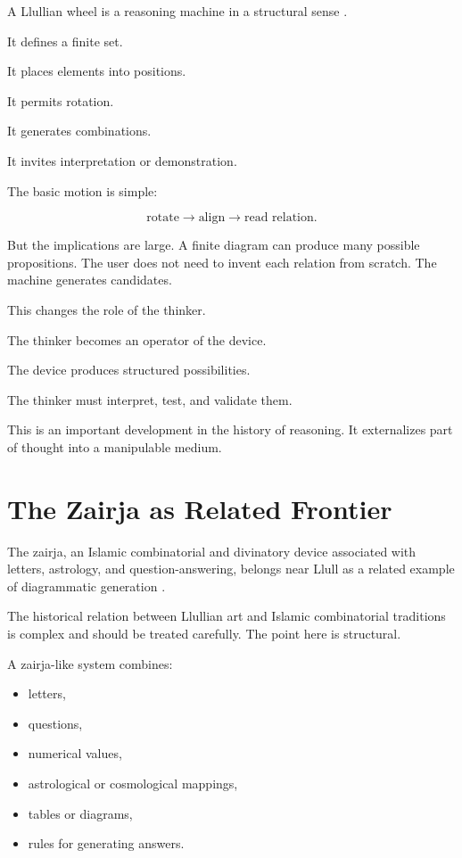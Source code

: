 \documentclass[11pt]{book}
\begin{document}
A Llullian wheel is a reasoning machine in a structural sense \cite{Yates1966ArtMemory,Yates1964GiordanoBruno,Bonner2007ArtLogicLlull}.

It defines a finite set.

It places elements into positions.

It permits rotation.

It generates combinations.

It invites interpretation or demonstration.

The basic motion is simple:

\[
\text{rotate}
\rightarrow
\text{align}
\rightarrow
\text{read relation}.
\]

But the implications are large. A finite diagram can produce many possible propositions. The user does not need to invent each relation from scratch. The machine generates candidates.

This changes the role of the thinker.

The thinker becomes an operator of the device.

The device produces structured possibilities.

The thinker must interpret, test, and validate them.

This is an important development in the history of reasoning. It externalizes part of thought into a manipulable medium.

\section{The Zairja as Related Frontier}

The zairja, an Islamic combinatorial and divinatory device associated with letters, astrology, and question-answering, belongs near Llull as a related example of diagrammatic generation \cite{Yates1966ArtMemory,Eco1995SearchPerfectLanguage}.

The historical relation between Llullian art and Islamic combinatorial traditions is complex and should be treated carefully. The point here is structural.

A zairja-like system combines:

\begin{itemize}
    \item letters,
    \item questions,
    \item numerical values,
    \item astrological or cosmological mappings,
    \item tables or diagrams,
    \item rules for generating answers.
\end{itemize}
\end{document}
